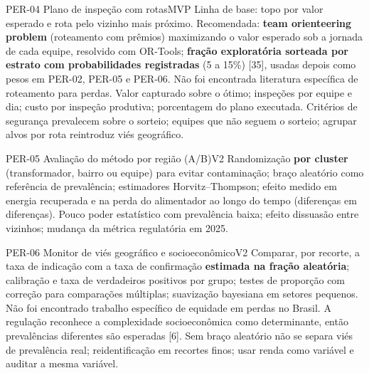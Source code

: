 \begin{ficha}{PER-04 \textperiodcentered{} Plano de inspeção com rotas}{MVP}
 Linha de base: topo por valor esperado e rota pelo vizinho
mais próximo. Recomendada: \textbf{team orienteering problem} (roteamento com
prêmios) maximizando o valor esperado sob a jornada de cada equipe, resolvido
com OR-Tools; \textbf{fração exploratória sorteada por estrato com
probabilidades registradas} (5 a 15\%) [35], usadas depois como pesos em
PER-02, PER-05 e PER-06. Não foi encontrada literatura específica de
roteamento para perdas.
 Valor capturado sobre o ótimo; inspeções por equipe e dia;
custo por inspeção produtiva; porcentagem do plano executada.
 Critérios de segurança prevalecem sobre o sorteio;
equipes que não seguem o sorteio; agrupar alvos por rota reintroduz viés geográfico.
\end{ficha}

\begin{ficha}{PER-05 \textperiodcentered{} Avaliação do método por região (A/B)}{V2}
 Randomização \textbf{por cluster} (transformador, bairro
ou equipe) para evitar contaminação; braço aleatório como referência de
prevalência; estimadores Horvitz--Thompson; efeito medido em energia
recuperada e na perda do alimentador ao longo do tempo (diferenças em
diferenças).
 Pouco poder estatístico com prevalência baixa; efeito
dissuasão entre vizinhos; mudança da métrica regulatória em 2025.
\end{ficha}

\begin{ficha}{PER-06 \textperiodcentered{} Monitor de viés geográfico e socioeconômico}{V2}
 Comparar, por recorte, a taxa de indicação com a taxa de
confirmação \textbf{estimada na fração aleatória}; calibração e taxa de
verdadeiros positivos por grupo; testes de proporção com correção para
comparações múltiplas; suavização bayesiana em setores pequenos. Não foi
encontrado trabalho específico de equidade em perdas no Brasil. A
regulação reconhece a complexidade socioeconômica como determinante, então
prevalências diferentes são esperadas [6].
 Sem braço aleatório não se separa viés de prevalência
real; reidentificação em recortes finos; usar renda como variável e auditar
a mesma variável.
\end{ficha}

